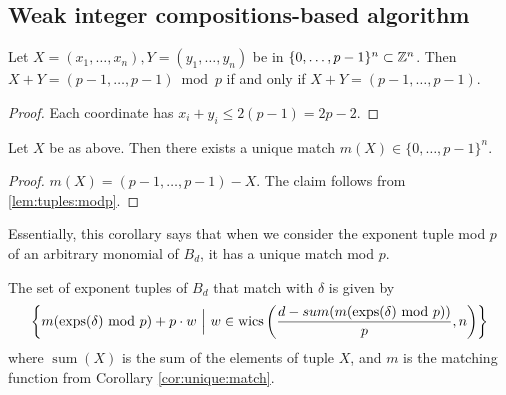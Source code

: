 


\subsection{Weak integer compositions-based algorithm}

\begin{lem}
	\label{lem:tuples:modp}
	Let \(X = (x_{1}, \ldots, x_{n}),
	Y = (y_{1}, \ldots, y_{n})\)
	be in \(\{0, \ldots, p-1\}^{n} \subset \mathbb{Z}^{n}\).
	Then \(X + Y = 
	(p-1, \ldots, p-1) \bmod p\)
	if and only if 
	\(X + Y = 
	(p-1, \ldots, p-1)\).
\end{lem}

\begin{proof}
	Each coordinate has \(x_{i} + y_{i} \leq 2(p-1) = 2p-2\).
\end{proof}

\begin{cor}
    \label{cor:unique:match}
	Let $X$ be as above.
	Then there exists a unique
	match \(m(X) \in \{0, \ldots, p-1\}^{n}\).
\end{cor}

\begin{proof}
	\(m(X) = 
	(p-1, \ldots, p-1) - X\).
	The claim follows from 
	\ref{lem:tuples:modp}.
\end{proof}

Essentially, this corollary says that
when we consider the exponent tuple mod $p$ of 
an arbitrary monomial of \(B_{d}\),
it has a unique
match mod \(p\).

\begin{lem}
    \label{lem:generate:matching}
    The set of exponent tuples of \(B_{d}\) that match with $\delta$ is given by 
    \[
        \left\{ m(\operatorname{exps}(\delta) \text{ mod } p) + p\cdot w ~\Big|~ w \in \operatorname{wics} 
        \left(\frac{d - sum(m(\operatorname{exps}(\delta) \text{ mod } p))}{p}, n \right) \right\}
    \]
    where $\operatorname{sum}(X)$ is the sum of the elements of tuple $X$, and $m$ is the matching function from Corollary \ref{cor:unique:match}.
\end{lem}

